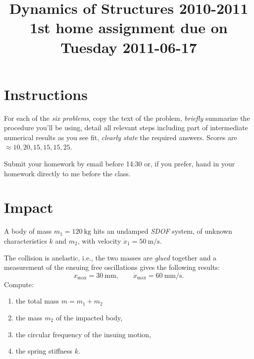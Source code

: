 \documentclass[11pt,a4paper]{article}
\title{Dynamics of Structures 2010-2011\\\large 1st home assignment
  due on Tuesday 2011-06-17}
\date{}
\def\linka{http://en.allexperts.com/q/Microsoft-Word-1058/2009/8/embedding-pdf-file.htm}
\begin{document}
\maketitle{}
\tableofcontents{}
\section*{Instructions}

For each of the \emph{six problems}, copy the text of the problem,
\emph{briefly} summarize the procedure you'll be using, detail all
relevant steps including part of intermediate numerical results as you
see fit, \emph{clearly state} the required answers. Scores
are${}\approx{}10, 20, 15, 15, 15, 25$.

Submit your homework by email before 14:30 or, if you prefer, hand in
your homework directly to me before the class.
\section{Impact}
\[\]
\noindent A body of mass $m_1=\SI{120}{\kilogram}$ hits an undamped
\emph{SDOF} system, of unknown characteristics $k$ and $m_2$, with
velocity $\dot{x}_1=\SI{50}{\meter\per\second}$.

The collision is anelastic, i.e., the two masses are \emph{glued} together
and a measurement of the ensuing free oscillations gives the following
results:
\[ x_\text{max} =\SI{30}{\milli\meter},\qquad
   \dot{x}_\text{max}=\SI{60}{\milli\meter\per\second}.\]
%
Compute:
\begin{enumerate}
\item the total mass $m=m_1+m_2$
\item the mass $m_2$ of the impacted body,
\item the circular frequency of the insuing motion,
\item the spring stiffness $k$.
\end{enumerate}
\end{document}
